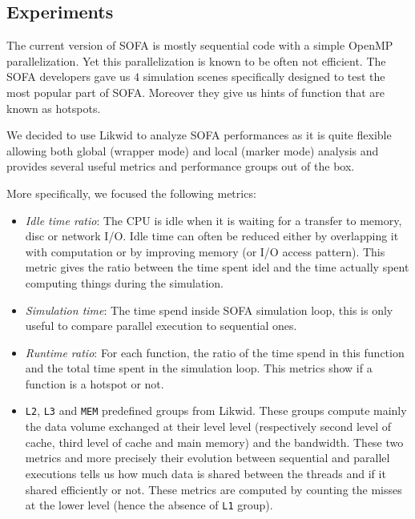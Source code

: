 \subsection{Experiments}

The current version of \gls{SOFA} is mostly sequential code with a simple \gls{OpenMP} parallelization.
Yet this parallelization is known to be often not efficient.
The \gls{SOFA} developers gave us $4$ simulation scenes specifically designed to test the most popular part of \gls{SOFA}.
Moreover they give us hints of function that are known as hotspots.

We decided to use \gls{Likwid} to analyze \gls{SOFA} performances as it is quite flexible allowing both global (wrapper mode) and local (marker mode) analysis and provides several useful metrics and performance groups out of the box.

More specifically, we focused the following metrics:
\begin{itemize}
    \item \emph{Idle time ratio}: The CPU is idle when it is waiting for a transfer to memory,  disc or network \gls{I/O}.
        Idle time can often be reduced either by overlapping it with computation or by improving memory (or \gls{I/O} access pattern).
        This metric gives the ratio between the time spent idel and the time actually spent computing things during the simulation.
    \item \emph{Simulation time}: The time spend inside \gls{SOFA} simulation loop, this is only useful to compare parallel execution to sequential ones.
    \item \emph{Runtime ratio}: For each function, the ratio of the time spend in this function and the total time spent in the simulation loop.
        This metrics show if a function is a hotspot or not.
    \item \texttt{L2}, \texttt{L3} and \texttt{MEM} predefined groups from \gls{Likwid}. These groups compute mainly the data volume exchanged at their level level (respectively second level of cache, third level of cache and main memory) and the bandwidth.
        These two metrics and more precisely their evolution between sequential and parallel executions tells us how much data is shared between the threads and if it shared efficiently or not.
        These metrics are computed by counting the misses at the lower level (hence the absence of \texttt{L1} group).
\end{itemize}

